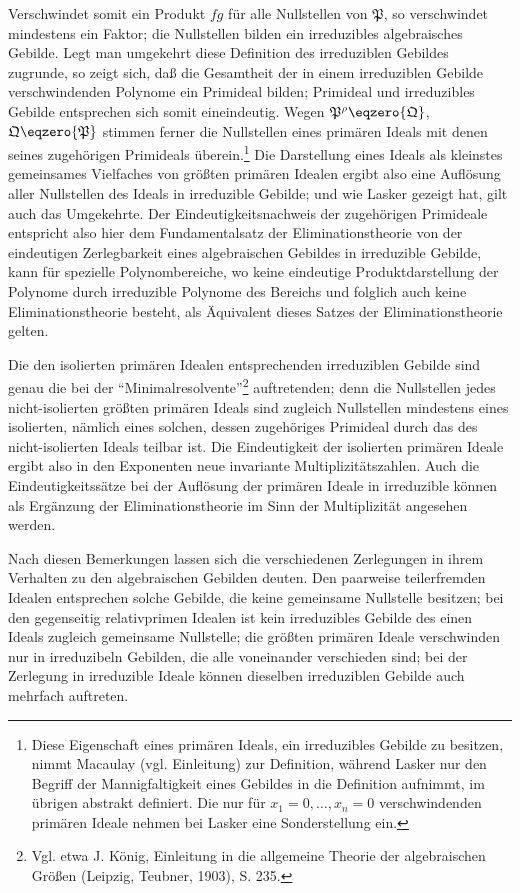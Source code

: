 \documentclass[11pt]{article}
\newcommand{\ideal}[1]{\mathfrak{#1}}
\begin{document}
Verschwindet somit ein Produkt $fg$ für alle Nullstellen von $\ideal P$, so verschwindet mindestens ein Faktor; die Nullstellen bilden ein irreduzibles algebraisches Gebilde. Legt man umgekehrt diese Definition des irreduziblen Gebildes zugrunde, so zeigt sich, daß die Gesamtheit der in einem irreduziblen Gebilde verschwindenden Polynome ein Primideal bilden; Primideal und irreduzibles Gebilde entsprechen sich somit eineindeutig. Wegen $\ideal P^\rho\eqzero{\ideal Q}$, $\ideal Q\eqzero{\ideal P}$ stimmen ferner die Nullstellen eines primären Ideals mit denen seines zugehörigen Primideals überein.\footnote{Diese Eigenschaft eines primären Ideals, ein irreduzibles Gebilde zu besitzen, nimmt Macaulay (vgl. Einleitung) zur Definition, während Lasker nur den Begriff der Mannigfaltigkeit eines Gebildes in die Definition aufnimmt, im übrigen abstrakt definiert. Die nur für $x_1=0,
\ldots,x_n=0$ verschwindenden primären Ideale nehmen bei Lasker eine Sonderstellung ein.} Die Darstellung eines Ideals als kleinstes gemeinsames Vielfaches von größten primären Idealen ergibt also eine Auflösung aller Nullstellen des Ideals in irreduzible Gebilde; und wie Lasker gezeigt hat, gilt auch das Umgekehrte. Der Eindeutigkeitsnachweis der zugehörigen Primideale entspricht also hier dem Fundamentalsatz der Eliminationstheorie von der eindeutigen Zerlegbarkeit eines algebraischen Gebildes in irreduzible Gebilde, kann für spezielle Polynombereiche, wo keine eindeutige Produktdarstellung der Polynome durch irreduzible Polynome des Bereichs und folglich auch keine Eliminationstheorie besteht, als Äquivalent dieses Satzes der Eliminationstheorie gelten.

Die den isolierten primären Idealen entsprechenden irreduziblen Gebilde sind genau die bei der ``Minimalresolvente''\footnote{Vgl. etwa J. König, Einleitung in die allgemeine Theorie der algebraischen Größen (Leipzig, Teubner, 1903), S. 235.} auftretenden; denn die Nullstellen jedes nicht-isolierten größten primären Ideals sind zugleich Nullstellen mindestens eines isolierten, nämlich eines solchen, dessen zugehöriges Primideal durch das des nicht-isolierten Ideals teilbar ist. Die Eindeutigkeit der isolierten primären Ideale ergibt also in den Exponenten neue invariante Multiplizitätszahlen. Auch die Eindeutigkeitssätze bei der Auflösung der primären Ideale in irreduzible können als Ergänzung der Eliminationstheorie im Sinn der Multiplizität angesehen werden.

Nach diesen Bemerkungen lassen sich die verschiedenen Zerlegungen in ihrem Verhalten zu den algebraischen Gebilden deuten. Den paarweise teilerfremden Idealen entsprechen solche Gebilde, die keine gemeinsame Nullstelle besitzen; bei den gegenseitig relativprimen Idealen ist kein irreduzibles Gebilde des einen Ideals zugleich gemeinsame Nullstelle; die größten primären Ideale verschwinden nur in irreduzibeln Gebilden, die alle voneinander verschieden sind; bei der Zerlegung in irreduzible Ideale können dieselben irreduziblen Gebilde auch mehrfach auftreten.
\end{document}
